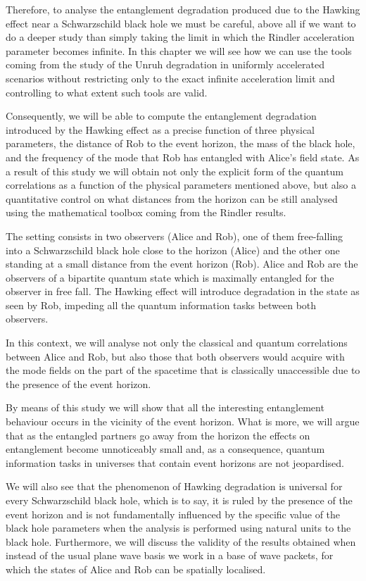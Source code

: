 Therefore, to analyse the entanglement degradation produced due to the
Hawking effect near a Schwarzschild black hole we must be careful,
above all if we want to do a deeper study than simply taking the limit in
which the Rindler acceleration parameter becomes infinite. In this chapter
we will see how we can use the tools coming from the study of the Unruh
degradation in uniformly accelerated scenarios without restricting only
to the exact infinite acceleration limit and controlling to what extent
such tools are valid.

Consequently, we will be able to compute the entanglement degradation
introduced by the Hawking effect as a precise function of three physical
parameters, the distance of Rob to the event horizon, the mass of the
black hole, and the frequency of the mode that Rob has entangled with
Alice's field state. As a result of this study we will obtain not only the
explicit form of the quantum correlations as a function of the physical
parameters mentioned above,  but also a  quantitative control on what
distances from the horizon can be still analysed using the mathematical
toolbox coming from the Rindler results.

The setting consists in two observers (Alice and Rob), one of them
free-falling into a Schwarzschild black hole  close to the horizon (Alice)
and the other one standing at a small distance  from the event horizon
(Rob). Alice and Rob are the observers of a bipartite quantum state which
is maximally entangled for the observer in free fall. The Hawking effect
will introduce degradation in the state as seen by Rob, impeding all the
quantum information tasks between both observers.

In this context, we will analyse not only the classical and quantum
correlations between Alice and Rob, but also those that both observers would acquire with the mode fields on
the part of the spacetime that is classically unaccessible due to the
presence of the event horizon.

By means of this study we will show that all the interesting entanglement
behaviour occurs in the vicinity of the event horizon. What is more, we will
argue that as the entangled partners go 
 away from the horizon the effects on entanglement become unnoticeably small and, as a consequence, quantum information
tasks  in universes that contain event horizons are not jeopardised.

We will also see that the phenomenon of Hawking degradation is
universal for every Schwarzschild black hole, which is to say, it is ruled by
the presence of the event horizon and is not fundamentally influenced by
the specific value of the black hole parameters when the analysis is
performed using natural units to the black hole.  Furthermore, we will discuss the validity of the results obtained when instead of the usual plane wave basis we work in a base of wave packets, for which the states of Alice and Rob can be spatially localised.

